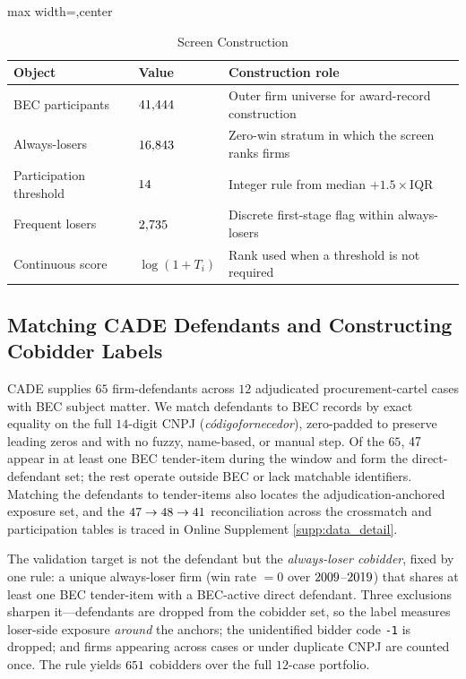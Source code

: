 \begin{table}[htbp]
\centering
\caption{Screen Construction}
\label{tab:screen_construction_app_submission}
\footnotesize
\begin{adjustbox}{max width=\textwidth,center}
\begin{tabular}{p{4.0cm}p{3.0cm}p{6.5cm}}
\toprule
Object & Value & Construction role \\
\midrule
BEC participants & $41{,}444$ & Outer firm universe for award-record construction \\
Always-losers & $16{,}843$ & Zero-win stratum in which the screen ranks firms \\
Participation threshold & $14$ & Integer rule from median $+1.5\times$IQR \\
Frequent losers & $2{,}735$ & Discrete first-stage flag within always-losers \\
Continuous score & $\log(1+T_i)$ & Rank used when a threshold is not required \\
\bottomrule
\end{tabular}
\end{adjustbox}
\end{table}

\subsection{Matching CADE Defendants and Constructing Cobidder Labels}
\label{app:cade_matching_submission}

CADE supplies $65$ firm-defendants across $12$ adjudicated
procurement-cartel cases with BEC subject matter. We match defendants
to BEC records by exact equality on the full $14$-digit CNPJ
(\emph{c\'odigofornecedor}), zero-padded to preserve leading zeros and
with no fuzzy, name-based, or manual step. Of the $65$, $47$
appear in at least one BEC tender-item during the window and form the
direct-defendant set; the rest operate outside BEC or lack matchable
identifiers. Matching the defendants to tender-items also locates the
adjudication-anchored exposure set, and the $47\to48\to
41$ reconciliation across the crossmatch and
participation tables is traced in Online Supplement
\ref{supp:data_detail}.

The validation target is not the defendant but the \emph{always-loser
cobidder}, fixed by one rule: a unique always-loser firm (win rate $=0$
over $2009$--$2019$) that shares at least one BEC
tender-item with a BEC-active direct defendant. Three exclusions
sharpen it---defendants are dropped from the cobidder set, so the label
measures loser-side exposure \emph{around} the anchors; the unidentified
bidder code \texttt{-1} is dropped; and firms appearing across cases or
under duplicate CNPJ are counted once. The rule yields
$651$ cobidders over the full $12$-case portfolio.

